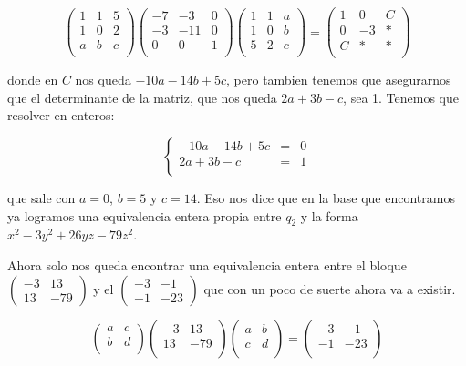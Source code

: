 \documentclass[12pt]{amsart}
\newcommand{\minimat}[4]{\left(\begin{smallmatrix} #1 & #2 \\ #3 & #4 
\end{smallmatrix}\right)}
\newcommand{\lp}{\left(}
\newcommand{\rp}{\right)}
\theoremstyle{plain}
\begin{document}
$$\lp\begin{matrix}
    1&1&5 \\
    1&0&2 \\
    a&b&c \\
\end{matrix}\rp
\lp\begin{matrix}
    -7&-3&0 \\
    -3&-11&0 \\
    0&0&1 \\
\end{matrix}\rp
\lp\begin{matrix}
    1&1&a \\
    1&0&b \\
    5&2&c \\
\end{matrix}\rp = 
\lp\begin{matrix}
    1&0&C\\
    0&-3&* \\
    C&*&* \\
\end{matrix}\rp$$

donde en $C$ nos queda $-10a-14b+5c$, pero tambien tenemos 
que asegurarnos que el determinante de la matriz, que nos 
queda $2a+3b-c$, sea 1. Tenemos que resolver en enteros:

$$\left\{
\begin{matrix}
    -10a-14b+5c &=&0 \\
    2a+3b-c &=&1 \\
\end{matrix}\right.$$

que sale con $a=0$, $b=5$ y $c=14$. Eso nos dice que en la 
base que encontramos ya logramos una equivalencia entera 
propia entre $q_2$ y la forma $x^2-3y^2+26yz-79z^2$.

Ahora solo nos queda encontrar una equivalencia entera
entre el bloque $\minimat{-3}{13}{13}{-79}$ y el $\minimat
{-3}{-1}{-1}{-23}$ que con un poco de suerte ahora va a existir.

$$\lp\begin{matrix}
    a&c \\
    b&d \\
\end{matrix}\rp
\lp\begin{matrix}
    -3&13 \\
    13&-79 \\
\end{matrix}\rp
\lp\begin{matrix}
    a&b \\
    c&d \\
\end{matrix}\rp = 
\lp\begin{matrix}
    -3&-1\\
    -1&-23 \\
\end{matrix}\rp$$
\end{document}
